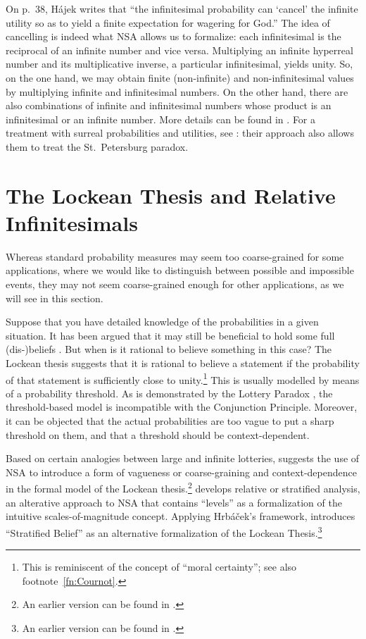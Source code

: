 On p.~38, H\'ajek writes that ``the infinitesimal probability can `cancel' the infinite utility so as to yield a finite expectation for wagering for God.''
The idea of cancelling is indeed what NSA allows us to formalize: each infinitesimal is the reciprocal of an infinite number and vice versa. Multiplying an infinite hyperreal number and its multiplicative inverse, a particular infinitesimal, yields unity. So, on the one hand, we may obtain finite (non-infinite) and non-infinitesimal values by multiplying infinite and infinitesimal numbers. On the other hand, there are also combinations of infinite and infinitesimal numbers whose product is an infinitesimal or an infinite number. More details can be found in \citet{Wenmackers:forthc}. For a treatment with surreal probabilities and utilities, see \citet{ChenRubio:forthc}: their approach also allows them to treat the St.~Petersburg paradox.

\section{The Lockean Thesis and Relative Infinitesimals}\label{sec:LT}
Whereas standard probability measures may seem too coarse-grained for some applications, where we would like to distinguish between possible and impossible events, they may not seem coarse-grained enough for other applications, as we will see in this section.

Suppose that you have detailed knowledge of the probabilities in a given situation. It has been argued that it may still be beneficial to hold some full (dis-)beliefs \citep{Foley:2009}. But when is it rational to believe something in this case? The Lockean thesis suggests that it is rational to believe a statement if the probability of that statement is sufficiently close to unity.\footnote{This is reminiscent of the concept of ``moral certainty''; see also footnote~\ref{fn:Cournot}.} This is usually modelled by means of a probability threshold. As is demonstrated by the Lottery Paradox \citep{Kyburg:1961}, the threshold-based model is incompatible with the Conjunction Principle. Moreover, it can be objected that the actual probabilities are too vague to put a sharp threshold on them, and that a threshold should be context-dependent.

Based on certain analogies between large and infinite lotteries, \citet{Wenmackers:2012f} suggests the use of NSA to introduce a form of vagueness or coarse-graining and context-dependence in the formal model of the Lockean thesis.\footnote{An earlier version can be found in \citet[Ch.~4]{Wenmackers:2011a}.} \citet{Hrbacek:2007} develops relative or stratified analysis, an alterative approach to NSA that contains ``levels'' as a formalization of the intuitive scales-of-magnitude concept. Applying Hrb\'{a}\v{c}ek's framework, \citet{Wenmackers:2013} introduces ``Stratified Belief'' as an alternative formalization of the Lockean Thesis.\footnote{An earlier version can be found in \citet[Ch.~3]{Wenmackers:2011a}.}

